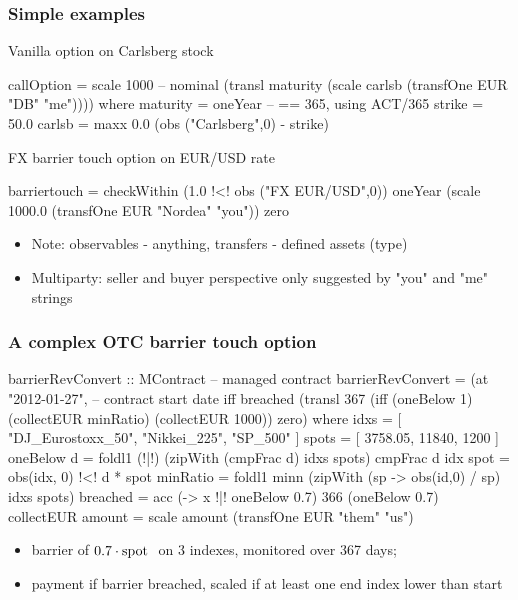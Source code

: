 \documentclass[xcolor=dvipsnames,11pt]{beamer}
\renewcommand{\emph}[1]{\textcolor{structure!90}{#1}}
\newcommand{\ttt}[1]{\mbox{\cd{#1}~}}
\begin{document}
\begin{frame}[fragile,t]
    \frametitle{Simple examples}

\emph{Vanilla option on Carlsberg stock}
\begin{hscodesmall}
callOption = scale 1000 -- nominal
              (transl maturity
                  (scale carlsb (transfOne EUR "DB" "me"))))
  where maturity = oneYear -- == 365, using ACT/365
        strike  = 50.0
        carlsb  = maxx 0.0 (obs ("Carlsberg",0) - strike)
\end{hscodesmall}

\emph{FX barrier touch option on EUR/USD rate}
\begin{hscodesmall}
barriertouch
  = checkWithin (1.0 !<! obs ("FX EUR/USD",0)) oneYear
                (scale 1000.0 (transfOne EUR "Nordea" "you"))
                zero
\end{hscodesmall}

\begin{itemize}
\item Note: \emph{observables} - anything, \emph{transfers} - defined assets (type)
\item Multiparty: seller and buyer perspective only suggested by "you" and "me" strings
\end{itemize}

\end{frame}

\begin{frame}[fragile,t]
    \frametitle{A complex OTC barrier touch option}

\begin{hscodesmall}
barrierRevConvert :: MContract -- managed contract
barrierRevConvert
   = (at "2012-01-27", -- contract start date
      iff breached (transl 367 
                    (iff (oneBelow 1)
                         (collectEUR minRatio) (collectEUR 1000))
                   zero) where 
  idxs   = [ "DJ_Eurostoxx_50", "Nikkei_225", "SP_500" ]
  spots  = [ 3758.05, 11840, 1200 ]
  oneBelow d = foldl1 (!|!) (zipWith (cmpFrac d) idxs spots)
  cmpFrac d idx spot = obs(idx, 0) !<! d * spot
  minRatio = foldl1 minn 
              (zipWith (\id sp -> obs(id,0) / sp) idxs spots)
  breached = acc (\x -> x !|! oneBelow 0.7) 366 (oneBelow 0.7)
  collectEUR amount = scale amount (transfOne EUR "them" "us")
\end{hscodesmall}

\begin{itemize}
\item barrier of $0.7 \cdot \ttt{spot}$ on 3 indexes, monitored over 367 days;
\item payment if barrier breached, scaled if at least one end index lower than start


\end{itemize}
\end{frame}
\end{document}
